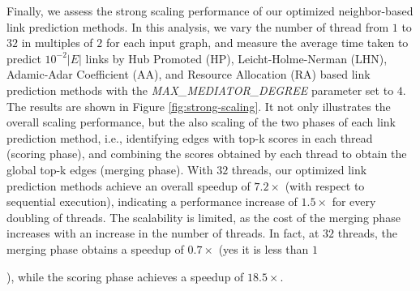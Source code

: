 Finally, we assess the strong scaling performance of our optimized neighbor-based link prediction methods. In this analysis, we vary the number of thread from $1$ to $32$ in multiples of $2$ for each input graph, and measure the average time taken to predict $10^{-2}|E|$ links by Hub Promoted (HP), Leicht-Holme-Nerman (LHN), Adamic-Adar Coefficient (AA), and Resource Allocation (RA) based link prediction methods with the \textit{MAX\_MEDIATOR\_DEGREE} parameter set to $4$. The results are shown in Figure \ref{fig:strong-scaling}. It not only illustrates the overall scaling performance, but the also scaling of the two phases of each link prediction method, i.e., identifying edges with top-k scores in each thread (scoring phase), and combining the scores obtained by each thread to obtain the global top-k edges (merging phase). With $32$ threads, our optimized link prediction methods achieve an overall speedup of $7.2\times$ (with respect to sequential execution), indicating a performance increase of $1.5\times$ for every doubling of threads. The scalability is limited, as the cost of the merging phase increases with an increase in the number of threads. In fact, at $32$ threads, the merging phase obtains a speedup of $0.7\times$ (yes it is less than $1$), while the scoring phase achieves a speedup of $18.5\times$.


